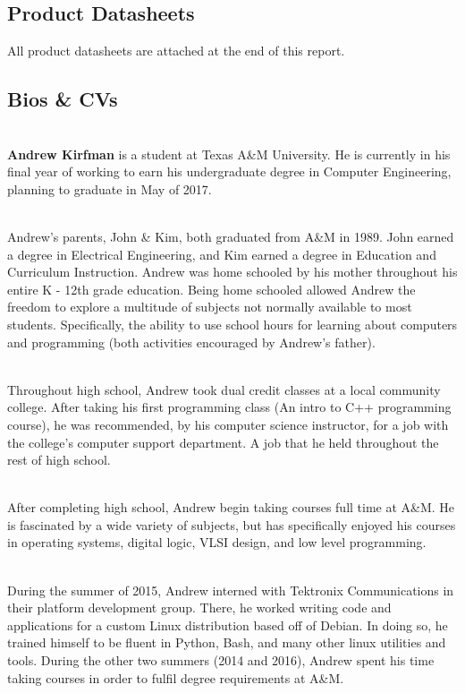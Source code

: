 \documentclass[12pt]{extarticle}
\begin{document}
\subsection{Product Datasheets}

All product datasheets are attached at the end of this report.  

\subsection{Bios \& CVs}

\ \\
{\large \textbf{Andrew Kirfman}} is a student at Texas A\&M University.  He is currently in his final year of working to earn his undergraduate degree in Computer Engineering, planning to graduate in May of 2017.  

\ \\
Andrew's parents, John \& Kim, both graduated from A\&M in 1989.  John earned a degree in Electrical Engineering, and Kim earned a degree in Education and Curriculum Instruction.  Andrew was home schooled by his mother throughout his entire K - 12th grade education.  Being home schooled allowed Andrew the freedom to explore a multitude of subjects not normally available to most students.  Specifically, the ability to use school hours for learning about computers and programming (both activities encouraged by Andrew's father).  

\ \\
Throughout high school, Andrew took dual credit classes at a local community college.  After taking his first programming class (An intro to C++ programming course), he was recommended, by his computer science instructor, for a job with the college's computer support department.  A job that he held throughout the rest of high school. 

\ \\
After completing high school, Andrew begin taking courses full time at A\&M.  He is fascinated by a wide variety of subjects, but has specifically enjoyed his courses in operating systems, digital logic, VLSI design, and low level programming.  

\ \\
During the summer of 2015, Andrew interned with Tektronix Communications in their platform development group.  There, he worked writing code and applications for a custom Linux distribution based off of Debian.  In doing so, he trained himself to be fluent in Python, Bash, and many other linux utilities and tools.  During the other two summers (2014 and 2016), Andrew spent his time taking courses in order to fulfil degree requirements at A\&M.  
\end{document}
